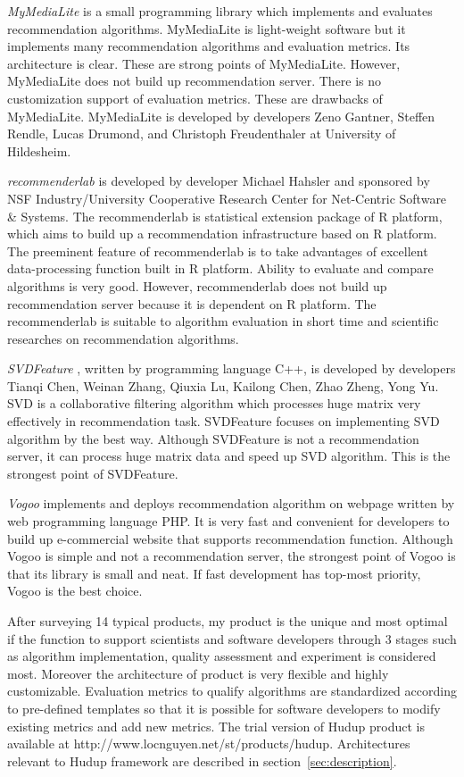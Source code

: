 \documentclass[a4paper]{llncs}
\begin{document}
\textit{MyMediaLite} \cite{mymedialite} is a small programming library which implements and evaluates recommendation algorithms. MyMediaLite is light-weight software but it implements many recommendation algorithms and evaluation metrics. Its architecture is clear. These are strong points of MyMediaLite. However, MyMediaLite does not build up recommendation server. There is no customization support of evaluation metrics. These are drawbacks of MyMediaLite. MyMediaLite is developed by developers Zeno Gantner, Steffen Rendle, Lucas Drumond, and Christoph Freudenthaler at University of Hildesheim.

\textit{recommenderlab} \cite{recommenderlab} is developed by developer Michael Hahsler and sponsored by NSF Industry/University Cooperative Research Center for Net-Centric Software \& Systems. The recommenderlab is statistical extension package of R platform, which aims to build up a recommendation infrastructure based on R platform. The preeminent feature of recommenderlab is to take advantages of excellent data-processing function built in R platform. Ability to evaluate and compare algorithms is very good. However, recommenderlab does not build up recommendation server because it is dependent on R platform. The recommenderlab is suitable to algorithm evaluation in short time and scientific researches on recommendation algorithms.

\textit{SVDFeature} \cite{svdfeature}, written by programming language C++, is developed by developers Tianqi Chen, Weinan Zhang, Qiuxia Lu, Kailong Chen, Zhao Zheng, Yong Yu. SVD is a collaborative filtering algorithm which processes huge matrix very effectively in recommendation task. SVDFeature focuses on implementing SVD algorithm by the best way. Although SVDFeature is not a recommendation server, it can process huge matrix data and speed up SVD algorithm. This is the strongest point of SVDFeature.

\textit{Vogoo} \cite{vogoo} implements and deploys recommendation algorithm on webpage written by web programming language PHP. It is very fast and convenient for developers to build up e-commercial website that supports recommendation function. Although Vogoo is simple and not a recommendation server, the strongest point of Vogoo is that its library is small and neat. If fast development has top-most priority, Vogoo is the best choice.

After surveying 14 typical products, my product is the unique and most optimal if the function to support scientists and software developers through 3 stages such as algorithm implementation, quality assessment and experiment is considered most. Moreover the architecture of product is very flexible and highly customizable. Evaluation metrics to qualify algorithms are standardized according to pre-defined templates so that it is possible for software developers to modify existing metrics and add new metrics. The trial version of Hudup product is available at http://www.locnguyen.net/st/products/hudup. Architectures relevant to Hudup framework are described in section~\ref{sec:description}.
\end{document}
